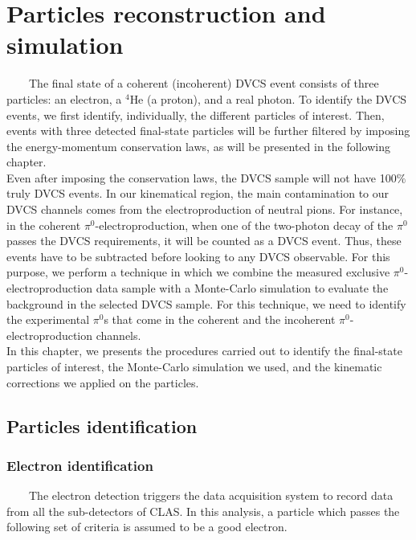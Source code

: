 \chapter{Particles reconstruction and simulation}
~~~~The final state of a coherent (incoherent) DVCS event consists of three 
particles: an electron, a $^4$He (a proton), and a real photon. To identify the 
DVCS events, we first identify, individually, the different particles of 
interest. Then, events with three detected final-state particles will be 
further filtered by imposing the energy-momentum conservation laws, as will be 
presented in the following chapter.\\ 


Even after imposing the conservation laws, the DVCS sample will not have 
100$\%$ truly DVCS events. In our kinematical region, the main contamination to 
our DVCS channels comes from the electroproduction of neutral pions. For 
instance, in the coherent $\pi^0$-electroproduction, when one of the two-photon 
decay of the $\pi^{0}$ passes the DVCS requirements, it will be counted as a 
DVCS event. Thus, these events have to be subtracted before looking to any DVCS 
observable. For this purpose, we perform a technique in which we combine the 
measured exclusive $\pi^0$-electroproduction data sample with a Monte-Carlo 
simulation to evaluate the background in the selected DVCS sample. For this 
technique, we need to identify the experimental $\pi^0$s that come in the 
coherent and the incoherent $\pi^0$-electroproduction channels.\\
 
 
In this chapter, we presents the procedures carried out to identify the 
final-state particles of interest, the Monte-Carlo simulation we used, and the 
kinematic corrections we applied on the particles.

\section{Particles identification}
     
\subsection{Electron identification} \label{Electron_identification}
~~~~The electron detection triggers the data acquisition system to record data 
from all the sub-detectors of CLAS. In this analysis, a particle which passes 
the following set of criteria is assumed to be a good electron.
  
